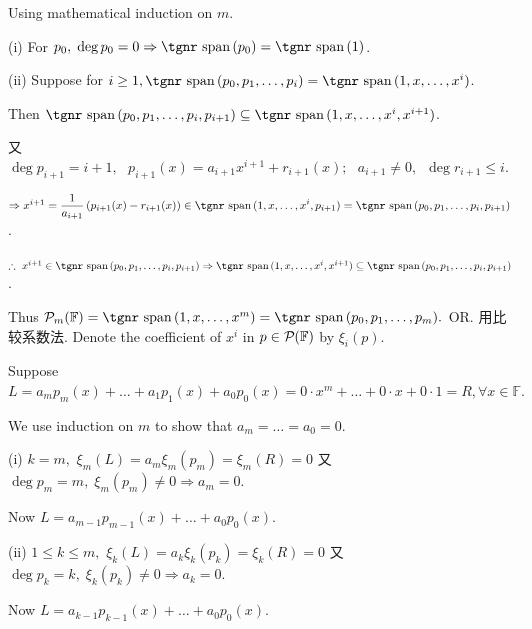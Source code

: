 \documentclass[a4paper, 11pt, UTF8]{article}
\def\Spn{{\textup{\tgnr span}}\,}
\def\Fbb{{\mathbb{F}}}
\def\Endi{\hspace{-2.5pt}}
\def\Hi{\quad\hspace{6.5pt}}
\def\Hii{\quad\hspace{7pt}}
\def\Or{{\large O{\footnotesize R.} }}
\begin{document}
\begin{large}
\par\quad
{\Large\vspace{4pt}Using mathematical induction on $m$.}\par\quad
(i) {\Large\vspace{8pt}For $p_0,\;\deg p_0=0\Rightarrow\Spn(p_0)=\Spn(1)$.}\par\quad\Endi
(ii) {\Large\vspace{4pt}Suppose for $i\geq 1,\Spn(p_0,p_1,\dots,p_i)=\Spn(1,x,\dots,x^i)$.}\par\quad\Hi
{\Large\vspace{4pt}Then $\Spn(p_0,p_1,\dots,p_i,p_{i+1})\subseteq\Spn(1,x,\dots,x^i,x^{i+1})$.}\par\quad\Hi
又 {\Large\vspace{4pt}$\deg p_{i+1}=i+1,\,\,\,\,p_{i+1}(x)=a_{i+1}x^{i+1}+r_{i+1}(x);\,\,\,\,a_{i+1}\neq 0,\,\,\,\deg r_{i+1}\leq i.$}
\par\vspace{2pt}\quad\Hi
{\Large\vspace{4pt}$\Rightarrow x^{i+1}=\displaystyle\frac{1}{a_{i+1}}\left(p_{i+1}(x)-r_{i+1}(x)\right)\in\Spn(1,x,\dots,x^i,p_{i+1})=\Spn(p_0,p_1,\dots,p_i,p_{i+1})$.}\par\vspace{2pt}\quad\Hi
{\Large\vspace{8pt}$\therefore\,\,x^{i+1}\in\Spn(p_0,p_1,\dots,p_i,p_{i+1})\Rightarrow\Spn(1,x,\dots,x^i,x^{i+1})\subseteq\Spn(p_0,p_1,\dots,p_i,p_{i+1})$.}\par\quad
{\Large\vspace{4pt}Thus $\PoF{m}=\Spn(1,x,\dots,x^m)=\Spn(p_0,p_1,\dots,p_m).$}\PfEnd\vspace{12pt}\quad
\Or 用比较系数法. {\Large\vspace{4pt}Denote the coefficient of $x^i$ in $p\in\PoF{}$ by $\xi_i(p).$}\par\quad
{\Large\vspace{4pt}Suppose $L=a_m p_m(x)+\dots+a_1 p_1(x)+a_0p_0(x)=0\cdot x^m+\dots+0\cdot x+0\cdot 1=R,\forall x\in\Fbb.$}\par\quad
{\Large\vspace{4pt}We use induction on $m$ to show that $a_m=\dots=a_0=0.$}\par\quad
(i) {\Large\vspace{4pt}$k=m,$ \;$\xi_{m}(L)=a_{m}\xi_{m}(p_m)=\xi_{m}(R)=0$ 又 $\deg p_m=m,\;\xi_{m}(p_m)\neq 0\Rightarrow a_m=0.$}\par\quad\Hi
{\Large\vspace{8pt}Now $L=a_{m-1}p_{m-1}(x)+\dots+a_0p_0(x).$}\par\quad\Endi
(ii) {\Large\vspace{4pt}$1\leq k\leq m,$ \;$\xi_{k}(L)=a_{k}\xi_{k}(p_k)=\xi_{k}(R)=0$ 又 $\deg p_k=k,\;\xi_{k}(p_k)\neq 0\Rightarrow a_k=0.$}\par\quad\Hii
{\Large Now $L=a_{k-1}p_{k-1}(x)+\dots+a_0p_0(x).$}\vspace{6pt}\PfEnd
\SepLine


\end{large}
\end{document}
